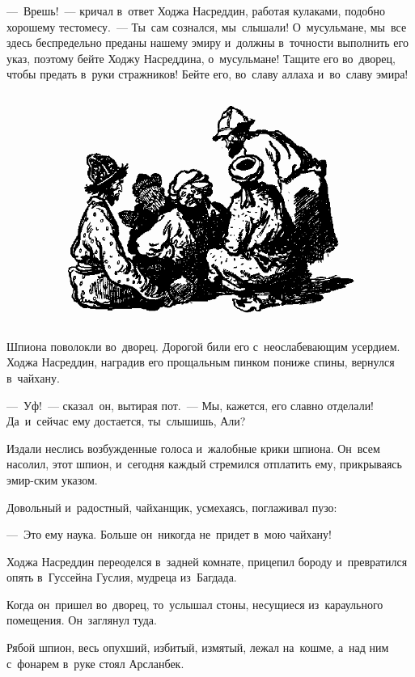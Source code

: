 \documentclass[12pt,a4paper]{book}
\begin{document}
—~Врешь!~— кричал в~ответ Ходжа Насреддин, работая кулаками, подобно хорошему тестомесу.~— Ты~сам сознался, мы~слышали! О~мусульмане, мы~все здесь беспредельно преданы нашему эмиру и~должны в~точности выполнить его указ, поэтому бейте Ходжу Насреддина, о~мусульмане! Тащите его во~дворец, чтобы предать в~руки стражников! Бейте его, во~славу аллаха и~во~славу эмира!

\begin{figure}[h]
\centering
\includegraphics[width=\textwidth]{16.png}
\end{figure}

Шпиона поволокли во~дворец. Дорогой били его с~неослабевающим усердием. Ходжа Насреддин, наградив его прощальным пинком пониже спины, вернулся в~чайхану.

—~Уф!~— сказал~он, вытирая пот.~— Мы, кажется, его славно отделали! Да~и~сейчас ему достается, ты~слышишь, Али?

Издали неслись возбужденные голоса и~жалобные крики шпиона. Он~всем насолил, этот шпион, и~сегодня каждый стремился отплатить ему, прикрываясь эмир-ским указом.

Довольный и~радостный, чайханщик, усмехаясь, поглаживал пузо:

—~Это ему наука. Больше он~никогда не~придет в~мою чайхану!

Ходжа Насреддин переоделся в~задней комнате, прицепил бороду и~превратился опять в~Гуссейна Гуслия, мудреца из~Багдада.

Когда он~пришел во~дворец, то~услышал стоны, несущиеся из~караульного помещения. Он~заглянул туда.

Рябой шпион, весь опухший, избитый, измятый, лежал на~кошме, а~над ним с~фонарем в~руке стоял Арсланбек.
\end{document}

